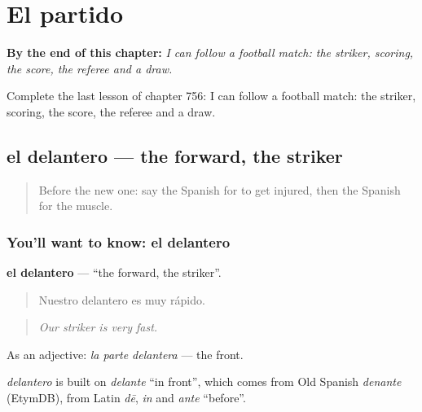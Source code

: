 
\chapter{El partido}
\label{ch:es-el-partido}

\begin{chapteropening}
\textbf{By the end of this chapter:} \emph{I can follow a football match: the striker, scoring, the score, the referee and a draw.}

Complete the last lesson of chapter 756: I can follow a football match: the striker, scoring, the score, the referee and a draw.
\end{chapteropening}

\section[el delantero]{el delantero — the forward, the striker}

\label{lesson:ES-C756-delantero}



\begin{quote}
Before the new one: say the Spanish for to get injured, then the Spanish for the muscle.
\end{quote}

\subsection*{You'll want to know: el delantero}
\textbf{el delantero} — \textquotedblleft{}the forward, the striker\textquotedblright{}.

\begin{quote}
Nuestro delantero es muy rápido.
\end{quote}

\begin{quote}
\emph{Our striker is very fast.}
\end{quote}

As an adjective: \emph{la parte delantera} — the front.

\begin{cousinweb}
\emph{delantero} is built on \emph{delante} \textquotedblleft{}in front\textquotedblright{}, which comes from Old Spanish \emph{denante} (EtymDB), from Latin \emph{dē}, \emph{in} and \emph{ante} \textquotedblleft{}before\textquotedblright{}.
\end{cousinweb}

